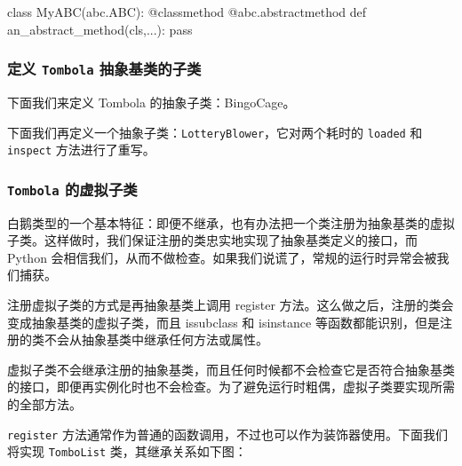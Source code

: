 \begin{python}
    class MyABC(abc.ABC):
    @classmethod
    @abc.abstractmethod
    def an_abstract_method(cls,...):
    pass
\end{python}

\subsubsection{定义 \texttt{Tombola} 抽象基类的子类}

下面我们来定义 Tombola 的抽象子类：BingoCage。



下面我们再定义一个抽象子类：\texttt{LotteryBlower}，它对两个耗时的 \texttt{loaded} 和 \texttt{inspect} 方法进行了重写。



\subsubsection{\texttt{Tombola} 的虚拟子类} 

白鹅类型的一个基本特征：即便不继承，也有办法把一个类注册为抽象基类的虚拟子类。这样做时，我们保证注册的类忠实地实现了抽象基类定义的接口，而 Python 会相信我们，从而不做检查。如果我们说谎了，常规的运行时异常会被我们捕获。

注册虚拟子类的方式是再抽象基类上调用 register 方法。这么做之后，注册的类会变成抽象基类的虚拟子类，而且 issubclass 和 isinstance 等函数都能识别，但是注册的类不会从抽象基类中继承任何方法或属性。

虚拟子类不会继承注册的抽象基类，而且任何时候都不会检查它是否符合抽象基类的接口，即便再实例化时也不会检查。为了避免运行时粗偶，虚拟子类要实现所需的全部方法。

\texttt{register} 方法通常作为普通的函数调用，不过也可以作为装饰器使用。下面我们将实现 \texttt{TomboList} 类，其继承关系如下图：

